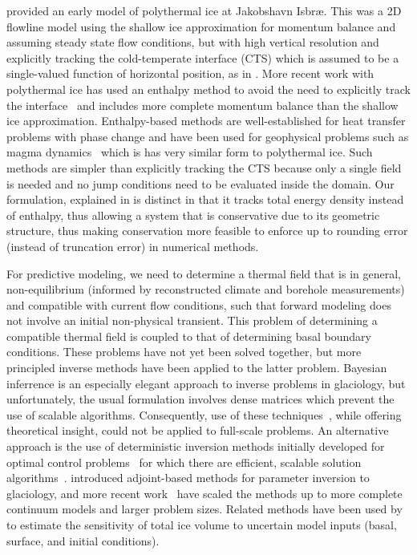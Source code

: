 
\citet{funk1994mechanisms2} provided an early model of polythermal ice at Jakobshavn Isbr{\ae}.
This was a 2D flowline model using the shallow ice approximation for momentum balance and assuming steady state flow conditions, but with high vertical resolution and explicitly tracking the cold-temperate interface (CTS) which is assumed to be a single-valued function of horizontal position, as in \citet{hutter1982polythermal,greve1997continuum}.
More recent work with polythermal ice has used an enthalpy method to avoid the need to explicitly track the interface~\citep[\eg][]{aschwanden2009mma,aschwanden2011enthalpy} and includes more complete momentum balance than the shallow ice approximation.
Enthalpy-based methods are well-established for heat transfer problems with phase change \citep[\eg][]{shamsundar1975amc,white1982efs} and have been used for geophysical problems such as magma dynamics~\citep{katz2008magma} which is has very similar form to polythermal ice.
Such methods are simpler than explicitly tracking the CTS because only a single field is needed and no jump conditions need to be evaluated inside the domain.
Our formulation, explained in  is distinct in that it tracks total energy density instead of enthalpy, thus allowing a system that is conservative due to its geometric structure, thus making conservation more feasible to enforce up to rounding error (instead of truncation error) in numerical methods.

For predictive modeling, we need to determine a thermal field that is in general, non-equilibrium (informed by reconstructed climate and borehole measurements) and compatible with current flow conditions, such that forward modeling does not involve an initial non-physical transient.
This problem of determining a compatible thermal field is coupled to that of determining basal boundary conditions.
These problems have not yet been solved together, but more principled inverse methods have been applied to the latter problem.
Bayesian inferrence is an especially elegant approach to inverse problems in glaciology, but unfortunately, the usual formulation \citep[\eg][]{tarantola2005ipt} involves dense matrices which prevent the use of scalable algorithms.
Consequently, use of these techniques~\citep{gudmundsson2008limit,raymond2009estimating}, while offering theoretical insight, could not be applied to full-scale problems.
An alternative approach is the use of deterministic inversion methods initially developed for optimal control problems~\citep{bueskens2000sqp} for which there are efficient, scalable solution algorithms~\citep{akcelik2006parallel}.
\citet{macayeal1992basal,macayeal1993tutorial} introduced adjoint-based methods for parameter inversion to glaciology, and more recent work~\citep{johnson2004ice,morlighem2010spatial} have scaled the methods up to more complete continuum models and larger problem sizes.
Related methods have been used by \citet{heimbach2009greenland} to estimate the sensitivity of total ice volume to uncertain model inputs (basal, surface, and initial conditions).
